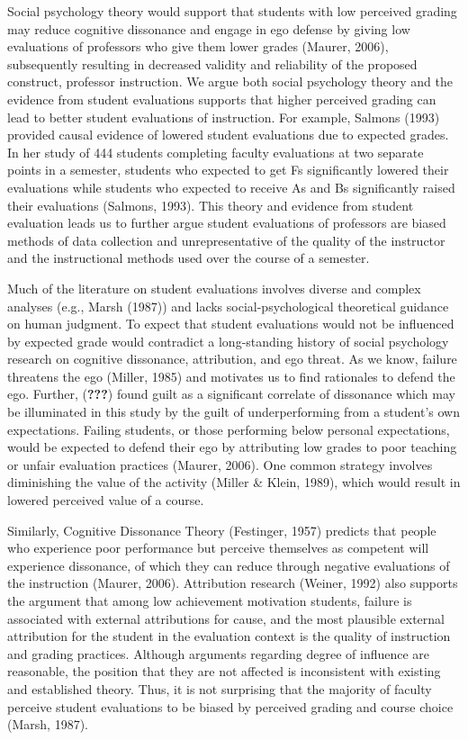 \documentclass[man]{apa6}
\theoremstyle{definition}
\theoremstyle{definition}
\theoremstyle{definition}
\theoremstyle{remark}
\begin{document}
Social psychology theory would support that students with low perceived
grading may reduce cognitive dissonance and engage in ego defense by
giving low evaluations of professors who give them lower grades (Maurer,
2006), subsequently resulting in decreased validity and reliability of
the proposed construct, professor instruction. We argue both social
psychology theory and the evidence from student evaluations supports
that higher perceived grading can lead to better student evaluations of
instruction. For example, Salmons (1993) provided causal evidence of
lowered student evaluations due to expected grades. In her study of 444
students completing faculty evaluations at two separate points in a
semester, students who expected to get Fs significantly lowered their
evaluations while students who expected to receive As and Bs
significantly raised their evaluations (Salmons, 1993). This theory and
evidence from student evaluation leads us to further argue student
evaluations of professors are biased methods of data collection and
unrepresentative of the quality of the instructor and the instructional
methods used over the course of a semester.

Much of the literature on student evaluations involves diverse and
complex analyses (e.g., Marsh (1987)) and lacks social-psychological
theoretical guidance on human judgment. To expect that student
evaluations would not be influenced by expected grade would contradict a
long-standing history of social psychology research on cognitive
dissonance, attribution, and ego threat. As we know, failure threatens
the ego (Miller, 1985) and motivates us to find rationales to defend the
ego. Further, ({\textbf{???}}) found guilt as a significant correlate of
dissonance which may be illuminated in this study by the guilt of
underperforming from a student's own expectations. Failing students, or
those performing below personal expectations, would be expected to
defend their ego by attributing low grades to poor teaching or unfair
evaluation practices (Maurer, 2006). One common strategy involves
diminishing the value of the activity (Miller \& Klein, 1989), which
would result in lowered perceived value of a course.

Similarly, Cognitive Dissonance Theory (Festinger, 1957) predicts that
people who experience poor performance but perceive themselves as
competent will experience dissonance, of which they can reduce through
negative evaluations of the instruction (Maurer, 2006). Attribution
research (Weiner, 1992) also supports the argument that among low
achievement motivation students, failure is associated with external
attributions for cause, and the most plausible external attribution for
the student in the evaluation context is the quality of instruction and
grading practices. Although arguments regarding degree of influence are
reasonable, the position that they are not affected is inconsistent with
existing and established theory. Thus, it is not surprising that the
majority of faculty perceive student evaluations to be biased by
perceived grading and course choice (Marsh, 1987).
\end{document}
